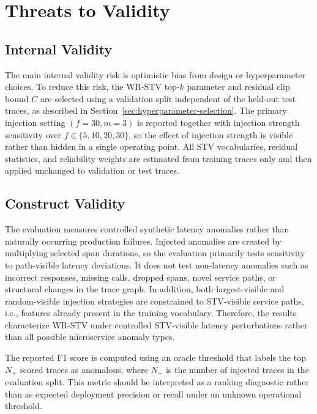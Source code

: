 \section{Threats to Validity}
\label{sec:threats}

\subsection{Internal Validity}

The main internal validity risk is optimistic bias from design or
hyperparameter choices. To reduce this risk, the WR-STV top-\(k\)
parameter and residual clip bound \(C\) are selected using a validation
split independent of the held-out test traces, as described in
Section~\ref{sec:hyperparameter-selection}. The primary injection
setting \((f=30, m=3)\) is reported together with injection
strength sensitivity over \(f \in \{5,10,20,30\}\), so the effect of injection
strength is visible rather than hidden in a single operating point.
All STV vocabularies, residual statistics, and reliability weights are
estimated from training traces only and then applied unchanged to
validation or test traces.

\subsection{Construct Validity}

The evaluation measures controlled synthetic latency anomalies rather
than naturally occurring production failures. Injected anomalies are
created by multiplying selected span durations, so the evaluation
primarily tests sensitivity to path-visible latency deviations. It does
not test non-latency anomalies such as incorrect responses, missing
calls, dropped spans, novel service paths, or structural changes in the
trace graph. In addition, both largest-visible and random-visible
injection strategies are constrained to STV-visible service paths, i.e.,
features already present in the training vocabulary. Therefore, the
results characterize WR-STV under controlled STV-visible latency
perturbations rather than all possible microservice anomaly types.

The reported F1 score is computed using an oracle threshold that labels
the top \(N_+\) scored traces as anomalous, where \(N_+\) is the number
of injected traces in the evaluation split. This metric should be
interpreted as a ranking diagnostic rather than as expected deployment
precision or recall under an unknown operational threshold.

